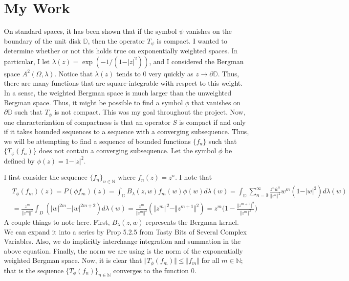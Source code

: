 \documentclass[12pt]{article}
\newcommand{\N}{\mathbb{N}}
\begin{document}
\section*{My Work}
On standard spaces, it has been shown that if the symbol $\psi$ vanishes on the boundary of the unit disk $\mathbb{D}$, then the operator $T_\psi$ is compact. I wanted to determine whether or not this holds true on exponentially weighted spaces. In particular, I let $\lambda(z) = \exp(-1/(1-\vert z \vert^2))$, and I considered the Bergman space $A^2(\Omega,\lambda)$. Notice that $\lambda(z)$ tends to $0$ very quickly as $z \rightarrow \partial{\mathbb{D}}$. Thus, there are many functions that are square-integrable with respect to this weight. In a sense, the weighted Bergman space is much larger than the unweighted Bergman space. Thus, it might be possible to find a symbol $\phi$ that vanishes on $\partial{\mathbb{D}}$ such that $T_\phi$ is not compact. This was my goal throughout the project. Now, one characterization of compactness is that an operator $S$ is compact if and only if it takes bounded sequences to a sequence with a converging subsequence. Thus, we will be attempting to find a sequence of bounded functions $\{f_n\}$ such that $\{T_\phi(f_n)\}$ does not contain a converging subsequence. 
Let the symbol $\phi$ be defined by $\phi(z) = 1 - \vert z \vert^2$. 
\par I first consider the sequence $\{f_n\}_{n \in \N}$ where $f_n(z) = z^n$. I note that
\begin{align*}
&T_\phi(f_m)(z) =  P(\phi f_m)(z) = \int_\mathbb{D} B_\lambda(z,w) f_m(w) \phi(w) d\lambda(w) = \int_\mathbb{D} \sum_{n=0}^\infty \frac{z^n \overline{w}^n}{\Vert z^n \Vert^2} w^m (1 - \vert w \vert^2) d\lambda(w) \\
&= \frac{z^m}{\Vert z^m \Vert^2} \int_D (\vert w \vert^{2m} - \vert w \vert^{2m+2}) d\lambda(w) = \frac{z^m}{\Vert z^m \Vert^2} (\Vert z^m \Vert^2 - \Vert z^{m+1} \Vert^2) = z^m \bigg( 1 - \frac{\Vert z^{m+1}\Vert^2}{\Vert z^m \Vert^2}\bigg)
\end{align*} A couple things to note here. First, $B_\lambda(z,w)$ represents the Bergman kernel. We can expand it into a series by Prop 5.2.5 from Tasty Bits of Several Complex Variables. Also, we do implicitly interchange integration and summation in the above equation. Finally, the norm we are using is the norm of the exponentially weighted Bergman space. Now, it is clear that  $\Vert T_\phi(f_m) \Vert \leq \Vert f_m \Vert$ for all $m \in \N$; that is the sequence $\{T_\phi(f_n)\}_{n \in \N}$ converges to the function $0$.
\end{document}
